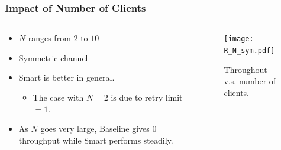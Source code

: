 \documentclass{beamer}
\begin{document}
\begin{frame}
\frametitle{Impact of Number of Clients}
\begin{columns}
  \begin{column}{.5\textwidth}
\begin{itemize}
\item $N$ ranges from $2$ to $10$
\item Symmetric channel
\item Smart is better in general.
  \begin{itemize}
    \item The case with $N=2$ is due to retry limit $=1$.
  \end{itemize}
\item As $N$ goes very large, Baseline gives $0$ throughput while Smart
  performs steadily.
\end{itemize}
  \end{column}
  \begin{column}{.5\textwidth}
\begin{figure}[htbp]
  \centering
  \texttt{[image: R\_N\_sym.pdf]}
  \caption{Throughout v.s. number of clients.}
\end{figure}
  \end{column}
\end{columns}
\end{frame}

\end{document}
